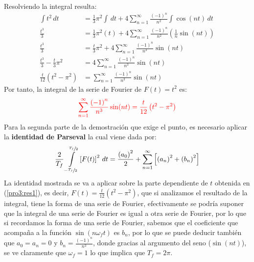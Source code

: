 \begin{multicols}{2}
Resolviendo la integral resulta:
\begin{align*}
    \int t^{2} \,dt &= \frac{1}{3}\pi^{2 }\int \,dt + 4 \sum_{n = 1}^{\infty} \frac{\left(-1\right)^{n}}{n^{2}} \int \cos(nt) \,dt\\
    \frac{t^{3}}{3} &= \frac{1}{3}\pi^{2} \left(t\right) + 4 \sum_{n = 1}^{\infty} \frac{\left(-1\right)^{n}}{n^{2}} \left(\frac{1}{n}\sin(nt)\right)\\
    \frac{t^{3}}{3} &= \frac{t}{3}\pi^{2} + 4 \sum_{n = 1}^{\infty} \frac{\left(-1\right)^{n}}{n^{3}} \sin(nt)\\
    \frac{t^{3}}{3} - \frac{t}{3}\pi^{2} &= 4 \sum_{n = 1}^{\infty} \frac{\left(-1\right)^{n}}{n^{3}} \sin(nt)\\
    \frac{t}{12} \left(t^{2} - \pi^{2}\right) &= \sum_{n = 1}^{\infty} \frac{\left(-1\right)^{n}}{n^{3}} \sin(nt)
\end{align*}
Por tanto, la integral de la serie de Fourier de $F(t) = t^{2}$ es:
\begin{equation}
    \textcolor{rojo}{\sum_{n = 1}^{\infty} \frac{\left(-1\right)^{n}}{n^{3}} \sin(nt) = \frac{t}{12} \left(t^{2} - \pi^{2}\right)} \label{pro3:res1}
\end{equation}
Para la segunda parte de la demostración que exige el punto, es necesario aplicar la \textbf{identidad de Parseval} la cual viene dada por:
\begin{equation*}
    \frac{2}{T_f} \int\limits_{-\sfrac{T_f}{2}}^{\sfrac{T_f}{2}} \left[F(t)\right]^{2} \,dt = \frac{\left(a_0\right)^{2}}{2} + \sum_{n=1}^{\infty} \left[\left(a_n\right)^{2} + \left(b_n\right)^{2}\right]
\end{equation*}
La identidad mostrada se va a aplicar sobre la parte dependiente de $t$ obtenida en (\ref{pro3:res1}), es decir, $F(t) = \frac{t}{12} \left(t^{2} - \pi^{2}\right)$, que si analizamos el resultado de la integral, tiene la forma de una serie de Fourier, efectivamente se podría suponer que la integral de una serie de Fourier es igual a otra serie de Fourier, por lo que si recordamos la forma de una serie de Fourier, sabemos que el coeficiente que acompaña a la función $\sin(n\omega_ft)$ es $b_n$, por lo que se puede deducir también que $a_0 = a_n = 0$ y $b_n = \frac{(-1)^{n}}{n^{3}}$, donde gracias al argumento del seno ($\sin(nt)$), se ve claramente que $\omega_f = 1$ lo que implica que $T_f = 2\pi$.


\end{multicols}
